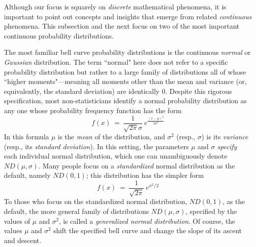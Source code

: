 Although our focus is squarely on {\em discrete} mathematical phenomena, it is important to point out concepts and insights that emerge from related {\em continuous} phenomena.  This subsection and the next focus on two of the most important continuous probability distributions.

\medskip

The most familiar bell curve probability distributions is the continuous {\em normal} or {\it Gaussian} distribution.  The term ``normal" here does not refer to a specific probability distribution but rather to a large family of distributions all of whose ``higher moments"---meaning all moments other than the mean and variance (or, equivalently, the standard deviation) are identically $0$.  Despite this rigorous specification, most non-statisticians identify a normal probability distribution as any one whose probability frequency function has the form
\[ f(x) \ = \ \frac{1}{\sqrt{2 \pi} \sigma} \ e^{\frac{(x - \mu)^2}{2 \sigma^2} } \]
In this formula $\mu$ is the {\it mean} of the distribution, and $\sigma^2$ (resp., $\sigma$) is its {\it variance} (resp., its {\it standard deviation}).  In this setting, the parameters $\mu$ and
$\sigma$ {\em specify} each individual normal distribution, which one can unambiguously denote $ND(\mu, \sigma)$.  Many people focus on a {\em standardized} normal distribution as the default, namely $ND(0,1)$; this distribution has the simpler form
\[ f(x) \ = \ \frac{1}{\sqrt{2 \pi}} \ e^{x^2/2} \]
To those who focus on the standardized normal distribution, $ND(0,1)$, as the default, the more general family of distributions $ND(\mu, \sigma)$, specified by the values of $\mu$ and $\sigma^2$, is called a {\em generalized normal distribution}.  Of course, the values $\mu$ and $\sigma^2$ shift the specified bell curve and change the slope of its ascent and descent.

\bigskip

\noindent {}

\bigskip

